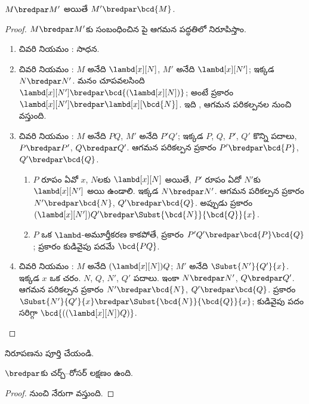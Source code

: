 \documentclass[../../../include/open-logic-section]{subfiles}
\begin{document}
\begin{lem}
  $M \bredpar M'$ అయితే $M' \bredpar \bcd{M}$.
\end{lem}
\begin{proof}
  $M \bredpar M'$కు సంబంధించిన పై
  ఆగమన పద్ధతిలో నిరూపిస్తాం.
  \begin{enumerate}
    \item చివరి నియమం : సాధన.
    \item చివరి నియమం : $M$ అనేది
      $\lambd[x][N]$, $M'$ అనేది $\lambd[x][N']$;
      ఇక్కడ $N \bredpar N'$. మనం చూపవలసింది
      $\lambd[x][N'] \bredpar
      \bcd{(\lambd[x][N])}$; అంటే 
      ప్రకారం $\lambd[x][N'] \bredpar
      \lambd[x][\bcd{N}]$. ఇది ,
      ఆగమన పరికల్పనల నుంచి వస్తుంది.
    \item చివరి నియమం : $M$ అనేది
      $PQ$, $M'$ అనేది $P'Q'$; ఇక్కడ $P$, $Q$, $P'$, $Q'$
      కొన్ని పదాలు, $P \bredpar P'$, $Q \bredpar Q'$.
      ఆగమన పరికల్పన ప్రకారం $P' \bredpar \bcd{P}$,
      $Q' \bredpar \bcd{Q}$.
      \begin{enumerate}
        \item $P$ రూపం ఏవో $x$, $N$లకు $\lambd[x][N]$
          అయితే, $P'$ రూపం ఏదో $N'$కు $\lambd[x][N']$ అయి ఉండాలి.
          ఇక్కడ $N \bredpar N'$. ఆగమన పరికల్పన ప్రకారం
          $N' \bredpar \bcd{N}$, $Q' \bredpar \bcd{Q}$.
          అప్పుడు  ప్రకారం
          $(\lambd[x][N'])Q' \bredpar
          \Subst{\bcd{N}}{\bcd{Q}}{x}$.
        \item $P$ ఒక $\lambd$-అమూర్తీకరణ కాకపోతే,
           ప్రకారం $P'Q' \bredpar
          \bcd{P}\bcd{Q}$;  ప్రకారం
          కుడివైపు పదమే $\bcd{PQ}$.
      \end{enumerate}
    \item చివరి నియమం : $M$ అనేది
      $(\lambd[x][N])Q$; $M'$ అనేది $\Subst{N'}{Q'}{x}$.
      ఇక్కడ $x$ ఒక చరం. $N$, $Q$, $N'$, $Q'$ పదాలు.
      ఇంకా $N \bredpar N'$, $Q \bredpar Q'$.
      ఆగమన పరికల్పన ప్రకారం $N' \bredpar \bcd{N}$,
      $Q' \bredpar \bcd{Q}$.  ప్రకారం
      $\Subst{N'}{Q'}{x} \bredpar
      \Subst{\bcd{N}}{\bcd{Q}}{x}$; కుడివైపు పదం
      సరిగ్గా $\bcd{((\lambd[x][N])Q)}$.
  \end{enumerate}
\end{proof}

\begin{prob}
   నిరూపణను పూర్తి చేయండి.
\end{prob}

\begin{thm}
  $\bredpar$కు చర్చ్--రోసర్ లక్షణం ఉంది.
\end{thm}

\begin{proof}
   నుంచి నేరుగా వస్తుంది.
\end{proof}
\end{document}

